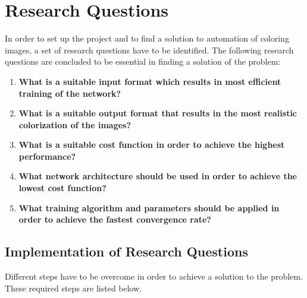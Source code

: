 \section{Research Questions}

In order to set up the project and to find a solution to automation of coloring images, a set of research questions have to be identified. The following research questions are concluded to be essential in finding a solution of the problem:

\begin{enumerate}
	\item \textbf{What is a suitable input format which results in most efficient training of the network?}
	\item \textbf{What is a suitable output format that results in the most realistic colorization of the images?}
	\item \textbf{What is a suitable cost function in order to achieve the highest performance?}
	\item \textbf{What network architecture should be used in order to achieve the lowest cost function?}
	\item \textbf{What training algorithm and parameters should be applied in order to achieve the fastest convergence rate?}
\end{enumerate}

\subsection{Implementation of Research Questions}
	
Different steps have to be overcome in order to achieve a solution to the problem. These required steps are listed below.

